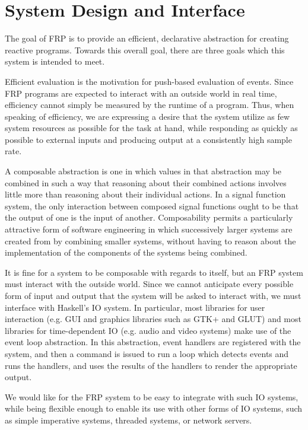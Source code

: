 \section{System Design and Interface}
\label{section:System_Design_and_Interface}

The goal of FRP is to provide an efficient, declarative abstraction for creating
reactive programs. Towards this overall goal, there are three goals which this
system is intended to meet.

Efficient evaluation is the motivation for push-based evaluation of events.
Since FRP programs are expected to  interact with an outside world in real time,
efficiency cannot simply be measured by the runtime of a program. Thus, when speaking of efficiency,
we are expressing a desire that the system utilize as few system resources as possible
for the task at hand, while responding as quickly as possible to external inputs and
producing output at a consistently high sample rate.

A composable abstraction is one in which values in that abstraction may be
combined in such a way that reasoning about their combined actions involves
little more than reasoning about their individual actions. In a signal function
system, the only interaction between composed signal functions ought to be that
the output of one is the input of another. Composability permits a particularly
attractive form of software engineering in which successively larger systems are
created from by combining smaller systems, without having to reason about the 
implementation of the components of the systems being combined.

It is fine for a system to be composable with regards to itself, but an FRP
system must interact with the outside world. Since we cannot anticipate every
possible form of input and output that the system will be asked to interact
with, we must interface with Haskell's IO system. In particular, most libraries
for user interaction (e.g. GUI and graphics libraries such as GTK+ and GLUT) and
most libraries for time-dependent IO (e.g. audio and video systems) make use of
the event loop abstraction. In this abstraction, event handlers are registered
with the system, and then a command is issued to run a loop which detects events
and runs the handlers, and uses the results of the handlers to render the
appropriate output. 

We would like for the FRP system to be easy to integrate with such IO systems,
while being flexible enough to enable its use with other forms of IO systems,
such as simple imperative systems, threaded systems, or network servers.

